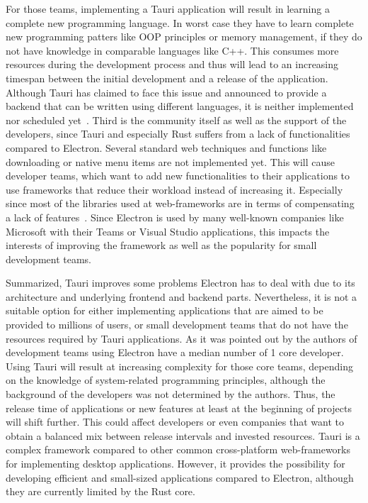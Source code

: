 For those teams, implementing a Tauri application will result in learning a complete new programming language.
In worst case they have to learn complete new programming patters like \ac{OOP} principles or memory management, if they do not have knowledge in comparable languages like C++.
This consumes more resources during the development process and thus will lead to an increasing timespan between the initial development and a release of the application.
Although Tauri has claimed to face this issue and announced to provide a backend that can be written using different languages, it is neither implemented nor scheduled yet~\cite{tauri}.
Third is the community itself as well as the support of the developers, since Tauri and especially Rust suffers from a lack of functionalities compared to Electron.
Several standard web techniques and functions like downloading or native menu items are not implemented yet.
This will cause developer teams, which want to add new functionalities to their applications to use frameworks that reduce their workload instead of increasing it.
Especially since most of the libraries used at web-frameworks are in terms of compensating a lack of features~\cite{explorationstudy}.
Since Electron is used by many well-known companies like Microsoft with their Teams or Visual Studio applications,
this impacts the interests of improving the framework as well as the popularity for small development teams.


Summarized, Tauri improves some problems Electron has to deal with due to its architecture and underlying frontend and backend parts.
Nevertheless, it is not a suitable option for either implementing applications that are aimed to be provided to millions of users, or small development teams that do not have the resources required by Tauri applications.
As it was pointed out by the authors of~\cite{explorationstudy} development teams using Electron have a median number of 1 core developer.
Using Tauri will result at increasing complexity for those core teams, depending on the knowledge of system-related programming principles, although the background of the developers was not determined by the authors.
Thus, the release time of applications or new features at least at the beginning of projects will shift further.
This could affect developers or even companies that want to obtain a balanced mix between release intervals and invested resources.
Tauri is a complex framework compared to other common cross-platform web-frameworks for implementing desktop applications.
However, it provides the possibility for developing efficient and small-sized applications compared to Electron, although they are currently limited by the Rust core.


